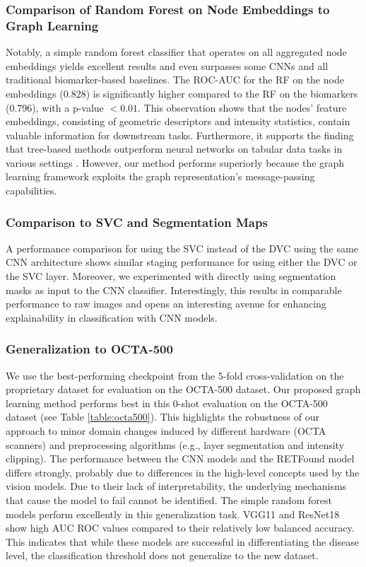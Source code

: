 \subsubsection{Comparison of Random Forest on Node Embeddings to Graph Learning}
Notably, a simple random forest classifier that operates on all aggregated node embeddings yields excellent results and even surpasses some CNNs and all traditional biomarker-based baselines. The ROC-AUC for the RF on the node embeddings (0.828) is significantly higher compared to the RF on the biomarkers (0.796), with a p-value $<0.01$. This observation shows that the nodes' feature embeddings, consisting of geometric descriptors and intensity statistics, contain valuable information for downstream tasks. Furthermore, it supports the finding that tree-based methods outperform neural networks on tabular data tasks in various settings \cite{grinsztajn2022tree}. However, our method performs superiorly because the graph learning framework exploits the graph representation's message-passing capabilities.


\subsubsection{Comparison to SVC and Segmentation Maps}
A performance comparison for using the SVC instead of the DVC using the same CNN architecture shows similar staging performance for using either the DVC or the SVC layer. Moreover, we experimented with directly using segmentation masks as input to the CNN classifier. Interestingly, this results in comparable performance to raw images and opens an interesting avenue for enhancing explainability in classification with CNN models. 

\subsubsection{Generalization to OCTA-500}
We use the best-performing checkpoint from the 5-fold cross-validation on the proprietary dataset for evaluation on the OCTA-500 dataset.  Our proposed graph learning method performs best in this 0-shot evaluation on the OCTA-500 dataset (see Table \ref{table:octa500}).  This highlights the robustness of our approach to minor domain changes induced by different hardware (OCTA scanners) and preprocessing algorithms (e.g., layer segmentation and intensity clipping). The performance between the CNN models and the RETFound model differs strongly, probably due to differences in the high-level concepts used by the vision models. Due to their lack of interpretability, the underlying mechanisms that cause the model to fail cannot be identified. The simple random forest models perform excellently in this generalization task. VGG11 and ResNet18 show high AUC ROC values compared to their relatively low balanced accuracy. This indicates that while these models are successful in differentiating the disease level, the classification threshold does not generalize to the new dataset. 